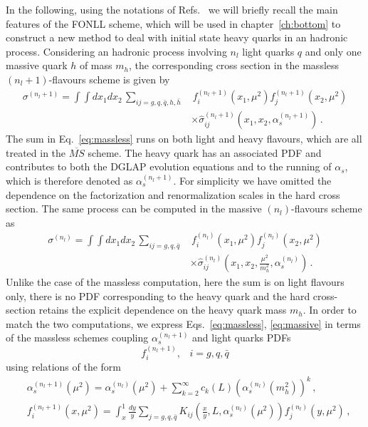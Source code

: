 %
In the following, using the notations of Refs.~\cite{Forte:2010ta,Forte:2015hba} we will briefly recall 
the main features of the FONLL scheme, which will be used in
chapter~\ref{ch:bottom} to construct a new method to deal with initial state heavy quarks in an hadronic process.
Considering an hadronic process involving $n_l$ light quarks $q$  and only one massive quark $h$ of mass $m_h$,
the corresponding cross section in the massless $(n_l+1)$-flavours scheme is given by
\begin{align}
    \label{eq:massless}
    \sigma^{(n_l+1)} = \int \int dx_1 dx_2\, \sum_{ij=g,q,\bar{q},h,\bar{h}}&\, 
    f_i^{(n_l+1)}\left(x_1,\mu^2\right)f_j^{(n_l+1)}\left(x_2,\mu^2\right) \nonumber \\
    &\times\hat{\sigma}^{(n_l+1)}_{ij}\left(x_1,x_2,\alpha_s^{(n_l+1)}\right)\,.
\end{align}
The sum in Eq.~\eqref{eq:massless} runs on both light and heavy flavours, which are all treated in the
$\overline{MS}$ scheme. The heavy quark has an associated PDF and contributes to both the
DGLAP evolution equations and to the running of $\alpha_s$, which is therefore denoted as $\alpha_s^{(n_l+1)}$. 
For simplicity we have omitted the
dependence on the factorization and renormalization scales in the hard cross section.
The same process can be computed in the massive $(n_l)$-flavours scheme as
\begin{align}
    \label{eq:massive}
    \sigma^{(n_l)} = \int \int dx_1 dx_2\, \sum_{ij=g,q,\bar{q}}&\, 
    f_i^{(n_l)}\left(x_1,\mu^2\right)f_j^{(n_l)}\left(x_2,\mu^2\right) \nonumber \\
    &\times\hat{\sigma}^{(n_l)}_{ij}\left(x_1,x_2,\frac{\mu^2}{m_h^2},\alpha_s^{(n_l)}\right)\,.
\end{align}
Unlike the case of the massless computation, here the sum is on light flavours only, there is no PDF corresponding
to the heavy quark and the hard cross-section retains the explicit dependence on the heavy quark mass $m_h$.
In order to match the two computations, we express Eqs.~\eqref{eq:massless}, \eqref{eq:massive} in terms of 
the massless schemes coupling $\alpha_s^{(n_l+1)}$ and light quarks PDFs 
\[ f^{(n_l+1)}_i,\,\,\,\,\, i = g,q,\bar{q} \] 
using relations of the form
\begin{align}
    \label{eq:matching_alpha}
    &\alpha_s^{(n_l+1)}\left(\mu^2\right) = 
    \alpha_s^{(n_l)}\left(\mu^2\right) 
    + \sum_{k=2}^{\infty} c_k\left(L\right) \left(\alpha_s^{(n_l)}\left(m_h^2\right)\right)^k\,, \\
    \label{eq:matching_PDFs}
    &f_i^{(n_l+1)}\left(x,\mu^2\right) = \int_x^1 \frac{dy}{y} 
    \sum_{j=g,q,\bar{q}} K_{ij}\left(\frac{x}{y}, L, \alpha_s^{(n_l)}\left(\mu^2\right)\right) f_j^{(n_l)}\left(y,\mu^2\right)\,,
\end{align}
